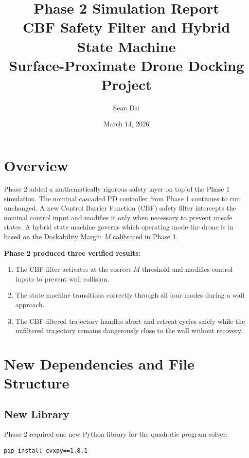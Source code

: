 \documentclass[12pt]{article}
\title{\textbf{Phase 2 Simulation Report} \\
\large CBF Safety Filter and Hybrid State Machine \\
\normalsize Surface-Proximate Drone Docking Project}
\author{Sean Dai}
\date{March 14, 2026}
\begin{document}
\maketitle
\tableofcontents
\newpage

\section{Overview}

Phase 2 added a mathematically rigorous safety layer on top of the
Phase 1 simulation. The nominal cascaded PD controller from Phase 1
continues to run unchanged. A new Control Barrier Function (CBF)
safety filter intercepts the nominal control input and modifies it
only when necessary to prevent unsafe states. A hybrid state machine
governs which operating mode the drone is in based on the Dockability
Margin $M$ calibrated in Phase 1.

\textbf{Phase 2 produced three verified results:}

\begin{enumerate}
    \item The CBF filter activates at the correct $M$ threshold and
          modifies control inputs to prevent wall collision.
    \item The state machine transitions correctly through all four
          modes during a wall approach.
    \item The CBF-filtered trajectory handles abort and retreat cycles
          safely while the unfiltered trajectory remains dangerously
          close to the wall without recovery.
\end{enumerate}

\section{New Dependencies and File Structure}

\subsection{New Library}

Phase 2 required one new Python library for the quadratic program solver:

\begin{lstlisting}[language=bash, numbers=none]
pip install cvxpy==1.8.1
\end{lstlisting}
\end{document}
